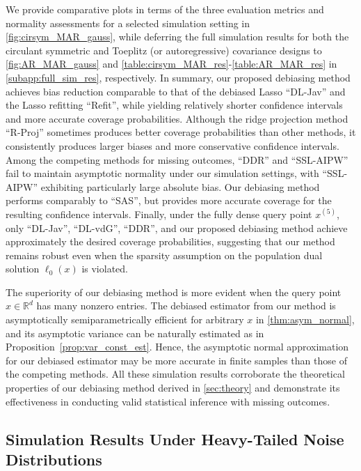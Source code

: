\documentclass[ejsv2,noshowframe]{imsart}
\theoremstyle{plain}
\theoremstyle{definition}
\theoremstyle{remark}
\begin{document}
We provide comparative plots in terms of the three evaluation metrics and normality assessments for a selected simulation setting in \autoref{fig:cirsym_MAR_gauss}, while deferring the full simulation results for both the circulant symmetric and Toeplitz (or autoregressive) covariance designs to \autoref{fig:AR_MAR_gauss} and \autoref{table:cirsym_MAR_res}-\ref{table:AR_MAR_res} in \autoref{subapp:full_sim_res}, respectively.
In summary, our proposed debiasing method achieves bias reduction comparable to that of the debiased Lasso ``DL-Jav'' and the Lasso refitting ``Refit'', while yielding relatively shorter confidence intervals and more accurate coverage probabilities. Although the ridge projection method ``R-Proj'' sometimes produces better coverage probabilities than other methods, it consistently produces larger biases and more conservative confidence intervals. Among the competing methods for missing outcomes, ``DDR'' and ``SSL-AIPW'' fail to maintain asymptotic normality under our simulation settings, with ``SSL-AIPW'' exhibiting particularly large absolute bias. Our debiasing method performs comparably to ``SAS'', but provides more accurate coverage for the resulting confidence intervals. Finally, under the fully dense query point $x^{(5)}$, only ``DL-Jav'', ``DL-vdG'', ``DDR'', and our proposed debiasing method achieve approximately the desired coverage probabilities, suggesting that our method remains robust even when the sparsity assumption on the population dual solution $\ell_0(x)$ is violated.

The superiority of our debiasing method is more evident when the query point $x\in \mathbb{R}^d$ has many nonzero entries. The debiased estimator from our method is asymptotically semiparametrically efficient for arbitrary $x$ in \autoref{thm:asym_normal}, and its asymptotic variance can be naturally estimated as in Proposition~\ref{prop:var_const_est}. Hence, the asymptotic normal approximation for our debiased estimator may be more accurate in finite samples than those of the competing methods. All these simulation results corroborate the theoretical properties of our debiasing method derived in \autoref{sec:theory} and demonstrate its effectiveness in conducting valid statistical inference with missing outcomes.


\subsection{Simulation Results Under Heavy-Tailed Noise Distributions}
\label{subsec:heavy_noises}
\end{document}
